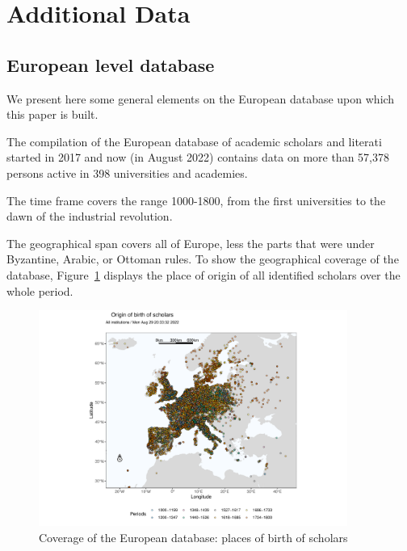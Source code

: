 \section{Additional Data}\label{appendix:data}

\subsection{European level database}\label{appendix:full}

We present here some general elements on the European database upon which this paper is built.

The compilation of the European database of academic scholars and literati started in 2017 and  now (in August 2022) contains data on more than 57,378 persons active in 398 universities and academies.

The time frame covers the range 1000-1800, from the first universities to the dawn of the industrial revolution.

The geographical span covers all of Europe, less the parts that were under Byzantine, Arabic, or Ottoman rules.
To show the geographical coverage of the database, Figure~\ref{fig:cov}  displays the place of origin of all identified scholars over the whole period.

\begin{figure}[p]
\begin{center}
\includegraphics[width=0.9\textwidth,trim={1.5cm 0cm 2cm 1.5cm},clip]{ALL-basin(births).pdf}
\end{center}
\caption{Coverage of the European database: places of birth of scholars}\label{fig:cov}
\end{figure}


